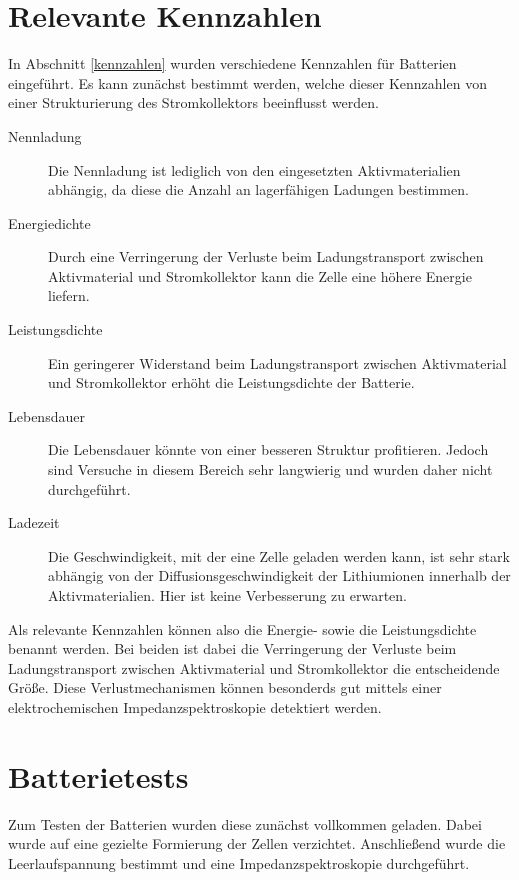 \documentclass[a4paper, 11pt, headsepline,footsepline,twoside,abstract]{scrbook}
\begin{document}
\section{Relevante Kennzahlen}
In Abschnitt \ref{kennzahlen} wurden verschiedene Kennzahlen für Batterien eingeführt. Es kann zunächst bestimmt werden, welche dieser Kennzahlen von einer Strukturierung des Stromkollektors beeinflusst werden.
\begin{description}
\item[Nennladung] Die Nennladung ist lediglich von den eingesetzten Aktivmaterialien abhängig, da diese die Anzahl an lagerfähigen Ladungen bestimmen.
\item[Energiedichte] Durch eine Verringerung der Verluste beim Ladungstransport zwischen Aktivmaterial und Stromkollektor kann die Zelle eine höhere Energie liefern.
\item[Leistungsdichte] Ein geringerer Widerstand beim Ladungstransport zwischen Aktivmaterial und Stromkollektor erhöht die Leistungsdichte der Batterie.
\item[Lebensdauer] Die Lebensdauer könnte von einer besseren Struktur profitieren. Jedoch sind Versuche in diesem Bereich sehr langwierig und wurden daher nicht durchgeführt.
\item[Ladezeit] Die Geschwindigkeit, mit der eine Zelle geladen werden kann, ist sehr stark abhängig von der Diffusionsgeschwindigkeit der Lithiumionen innerhalb der Aktivmaterialien. Hier ist keine Verbesserung zu erwarten.
\end{description}
Als relevante Kennzahlen können also die Energie- sowie die Leistungsdichte benannt werden. Bei beiden ist dabei die Verringerung der Verluste beim Ladungstransport zwischen Aktivmaterial und Stromkollektor die entscheidende Größe. Diese Verlustmechanismen können besonderds gut mittels einer elektrochemischen Impedanzspektroskopie detektiert werden.
\section{Batterietests}
Zum Testen der Batterien wurden diese zunächst vollkommen geladen. Dabei wurde auf eine gezielte Formierung der Zellen verzichtet. Anschließend wurde die Leerlaufspannung bestimmt und eine Impedanzspektroskopie durchgeführt.
\end{document}
